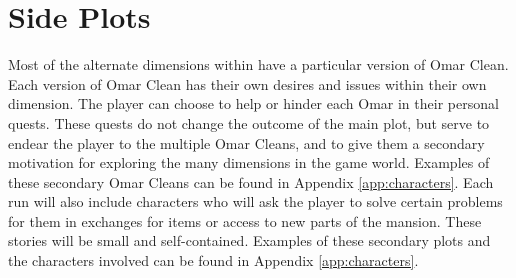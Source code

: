 \section{Side Plots}
Most of the alternate dimensions within \ourgame{} have a particular version of Omar Clean. Each version of Omar Clean has their own desires and issues within their own dimension. The player can choose to help or hinder each Omar in their personal quests. These quests do not change the outcome of the main plot, but serve to endear the player to the multiple Omar Cleans, and to give them a secondary motivation for exploring the many dimensions in the game world. Examples of these secondary Omar Cleans can be found in Appendix \ref{app:characters}. Each run will also include characters who will ask the player to solve certain problems for them in exchanges for items or access to new parts of the mansion. These stories will be small and self-contained. Examples of these secondary plots and the characters involved can be found in Appendix \ref{app:characters}.